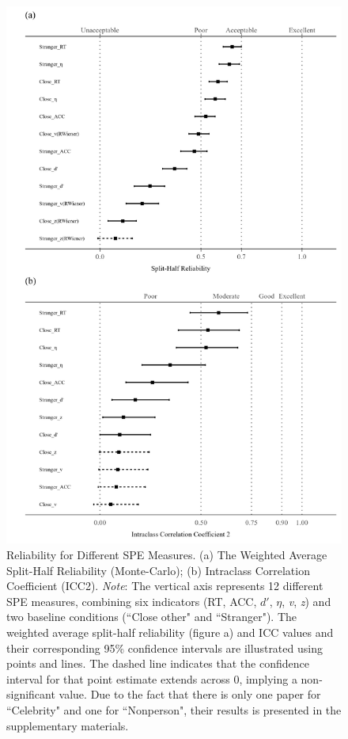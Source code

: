 \documentclass[sn-apa]{sn-jnl}%
\theoremstyle{thmstyleone}%
\theoremstyle{thmstyletwo}%
\theoremstyle{thmstylethree}%
\begin{document}
\begin{figure}[!htbp]
	\centering
	\includegraphics[width=1\textwidth]{./Figure/Fig_4_shr_icc.png}
	\caption{ Reliability for Different SPE Measures. (a) The Weighted Average Split-Half Reliability (Monte-Carlo); (b) Intraclass Correlation Coefficient (ICC2). \textit{Note}: The vertical axis represents 12 different SPE measures, combining six indicators (RT, ACC, $d'$, $\eta$, \textit{v}, \textit{z}) and two baseline conditions (``Close other" and ``Stranger"). The weighted average split-half reliability (figure a) and ICC values and their corresponding 95\% confidence intervals are illustrated using points and lines. The dashed line indicates that the confidence interval for that point estimate extends across 0, implying a non-significant value. Due to the fact that there is only one paper for ``Celebrity" and one for ``Nonperson", their results is presented in the supplementary materials.
	}
	\label{fig:shr_icc}
\end{figure}
\end{document}
